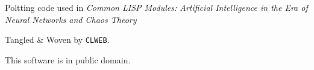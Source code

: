 Poltting code used in {\it Common LISP Modules: Artificial Intelligence in the Era of Neural Networks and Chaos Theory}

Tangled \& Woven by {\tt CLWEB}.

This software is in public domain.

\bye
